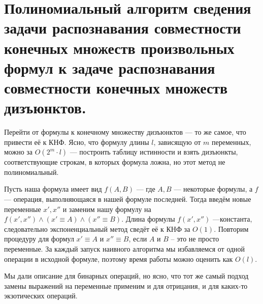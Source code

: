 \documentclass{article}
\begin{document}
\section{Полиномиальный алгоритм сведения задачи распознавания совместности конечных множеств произвольных формул к задаче распознавания совместности конечных множеств дизъюнктов.}
Перейти от формулы к конечному множеству дизъюнктов --- то же самое, что привести её к КНФ. Ясно, что формулу длины $l$, зависящую от $m$ переменных, можно за $O(2^m \cdot l)$ --- построить таблицу истинности и взять дизъюнкты, соответствующие строкам, в которых формула ложна, но этот метод не полиномиальный.

Пусть наша формула имеет вид $f(A, B)$ --- где $A, B$ --- некоторые формулы, а $f$ --- операция, выполняющаяся в нашей формуле последней. Тогда введём новые переменные $x', x''$ и заменим нашу формулу на $f(x', x'') \land (x' \equiv A) \land (x'' \equiv B)$. Длина формулы $f(x', x'')$ ---константа, следовательно экспоненциальный метод сведёт её к КНФ за $O(1)$. Повторим процедуру для формул $x' \equiv A$ и $x'' \equiv B$, если $A$ и $B$ -- это не просто переменные. За каждый запуск наивного алгоритма мы избавляемся от одной операции в исходной формуле, поэтому время работы можно оценить как $O(l)$.

Мы дали описание для бинарных операций, но ясно, что тот же самый подход замены выражений на переменные применим и для отрицания, и для каких-то экзотических операций.
\end{document}
